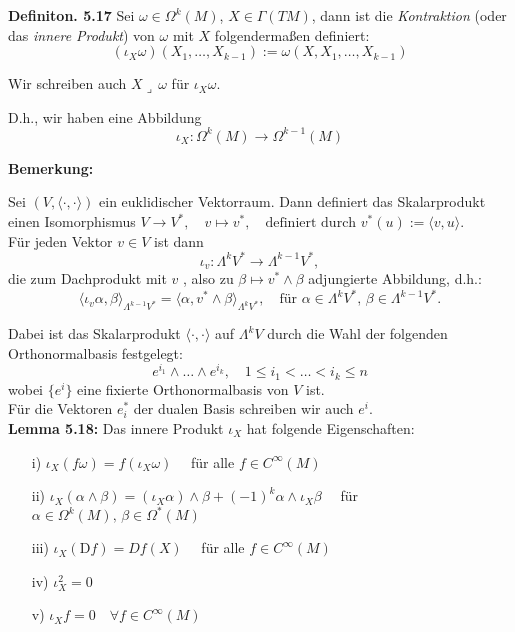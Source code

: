 \documentclass[fleqn, 12pt, letterpaper]{article}
\begin{document}
\textbf{Definiton. 5.17}  
Sei \( \omega \in \Omega^k(M) \), \( X \in \Gamma(TM) \), dann ist die \emph{Kontraktion} (oder das \emph{innere Produkt}) von \( \omega \) mit \( X \) folgendermaßen definiert:
\[
(\iota_X \omega)(X_1, \dots, X_{k-1}) := \omega(X, X_1, \dots, X_{k-1})
\]

Wir schreiben auch \( X \lrcorner \, \omega \) für \( \iota_X \omega \).

D.h., wir haben eine Abbildung
\[
\iota_X : \Omega^k(M) \to \Omega^{k-1}(M)
\]

\textbf{Bemerkung:}  

Sei \( (V, \langle \cdot, \cdot \rangle) \) ein euklidischer Vektorraum. Dann definiert das Skalarprodukt einen Isomorphismus
\(
V \to V^*, \quad v \mapsto v^*, \quad \text{definiert durch } v^*(u) := \langle v, u \rangle.
\)\\

Für jeden Vektor \( v \in V \) ist dann
\[
\iota_v : \Lambda^k V^* \to \Lambda^{k-1} V^*,
\]
die zum Dachprodukt mit \( v \) , also zu $\beta\mapsto v^*\wedge\beta$ adjungierte Abbildung, d.h.:
\[
\langle \iota_v \alpha, \beta \rangle_{\Lambda^{k-1}V^*} = \langle \alpha, v^* \wedge \beta \rangle_{\Lambda^{k}V^*}, \quad \text{für } \alpha \in \Lambda^{k} V^*, \, \beta \in \Lambda^{k-1} V^*.
\]

Dabei ist das Skalarprodukt \( \langle \cdot, \cdot \rangle \) auf \( \Lambda^k V \) durch die Wahl der folgenden Orthonormalbasis festgelegt:
\[
e^{i_1} \wedge \dots \wedge e^{i_k}, \quad 1 \le i_1 < \dots < i_k \le n
\]
wobei \( \{ e^i \} \) eine fixierte Orthonormalbasis von \( V \) ist. \\
Für die Vektoren \( e_i^* \) der dualen Basis schreiben wir auch \( e^i \).\\

\textbf{Lemma 5.18:}  
Das innere Produkt \( \iota_X \) hat folgende Eigenschaften:

\begin{itemize}
  \item[i)] \( \iota_X(f \omega) = f ( \iota_X \omega) \quad \) für alle \( f \in C^\infty(M) \)
  \item[ii)] \( \iota_X(\alpha \wedge \beta) = (\iota_X \alpha) \wedge \beta + (-1)^k \alpha \wedge \iota_X \beta \quad \) für \( \alpha \in \Omega^k(M), \, \beta \in \Omega^*(M) \)
  \item[iii)] \( \iota_X(\mathrm{D}f) = Df(X) \quad \) für alle \( f \in C^\infty(M) \)
  \item[iv)] \( \iota_X^2 = 0 \)
  \item[v)] \( \iota_X f = 0 \quad \forall f \in C^\infty(M) \)
\end{itemize}
\end{document}
